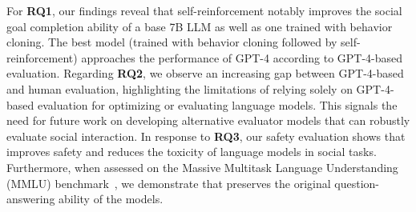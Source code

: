 For \textbf{RQ1}, our findings reveal that self-reinforcement notably improves the social goal completion ability of a base 7B LLM as well as one trained with behavior cloning. The best model (trained with behavior cloning followed by self-reinforcement) approaches the performance of GPT-4 according to GPT-4-based evaluation. Regarding \textbf{RQ2}, we observe an increasing gap between GPT-4-based and human evaluation, highlighting the limitations of relying solely on GPT-4-based evaluation for optimizing or evaluating language models. This signals the need for future work on developing alternative evaluator models that can robustly evaluate social interaction. In response to \textbf{RQ3}, our safety evaluation shows that \model improves safety and reduces the toxicity of language models in social tasks. Furthermore, when assessed on the Massive Multitask Language Understanding (MMLU) benchmark~\cite{hendrycks2020measuring}, we demonstrate that \model preserves the original question-answering ability of the models. 
